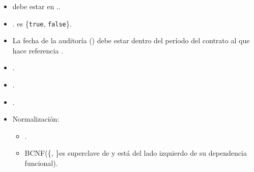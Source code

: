           \begin{itemize}
              \item {} debe estar en ..
              \item {}. es \{\texttt{true},
                    \texttt{false}\}.
              \item La fecha de la auditoría () debe estar dentro del
                  período del contrato al que hace referencia .
              \item {}.
              \item {}.
              \item {}.
              \item Normalización:
                    \begin{itemize}
                        \item {}.
                        \item BCNF(\{, \}es superclave de
                               y está del lado izquierdo de su dependencia funcional).
                    \end{itemize}
          \end{itemize}



